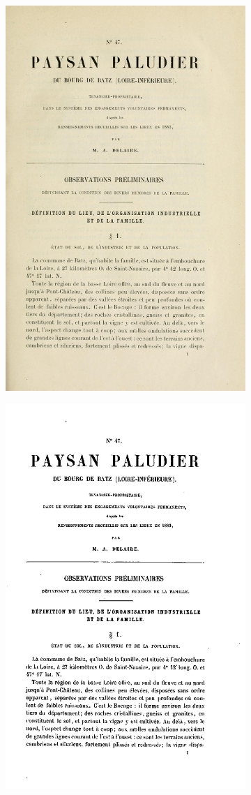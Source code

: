 \begin{figure}[ht]
    \centering
    \begin{subfigure}[t]{0.4\textwidth}
     \includegraphics[width=0.7\linewidth]{img/title_s2t1_m47_p1.png}
    \end{subfigure}
    \hspace{5pt}
    \begin{subfigure}[t]{0.4\textwidth}
     \includegraphics[width=0.7\linewidth]{img/title_binarize.png}

\end{subfigure}
\end{figure}
